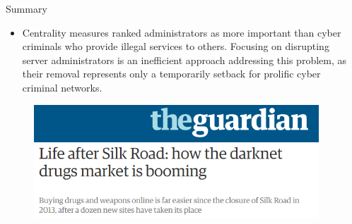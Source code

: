 \documentclass[hyperref={pdfpagelabels=false}]{beamer}
\begin{document}
\begin{frame}[fragile]
\begin{columns}[t]
\begin{column}{.45\textwidth}
\begin{block}{Summary}
  \begin{itemize}
    \item Centrality measures ranked administrators as more important than cyber criminals who provide illegal services to others. Focusing on disrupting server administrators is an inefficient approach addressing this problem, as their removal represents only a temporarily setback for prolific cyber criminal networks.
  \end{itemize}
  \begin{figure}
    \includegraphics[scale=1.4]{figures/theguardian.png}
  \end{figure}
\end{block}

%
%  

\end{column} %

\begin{column}{.039\textwidth}\end{column} %

\end{columns} %

\end{frame}
\end{document}
